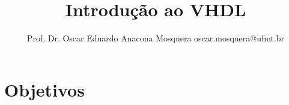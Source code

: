 \documentclass[aspectratio=169]{beamer}
\title[Minicurso FPGAs]{\huge Introdução ao VHDL} %
\author[Prof. Dr. Oscar Eduardo Anacona Mosquera]{Prof. Dr. Oscar Eduardo Anacona Mosquera \newline\newline 
\scriptsize{oscar.mosquera@ufmt.br}
}%
\begin{document}
\begin{frame}[plain]
\titlepage

\end{frame}



\section{Objetivos}
\end{document}
